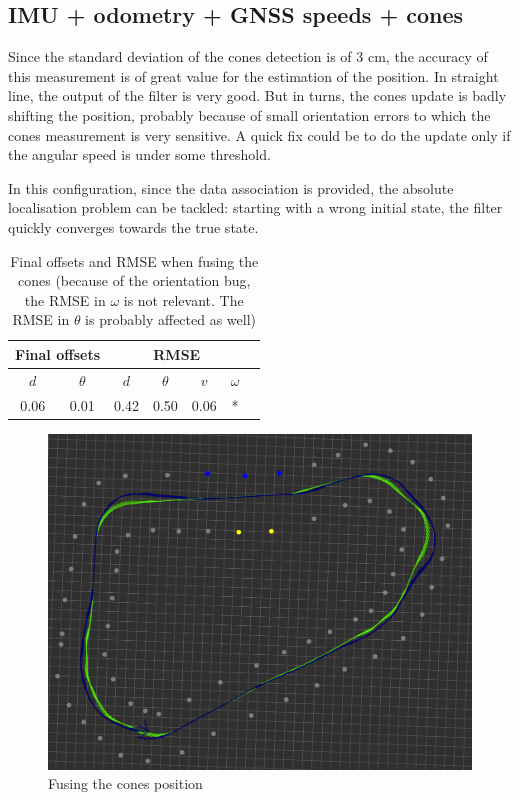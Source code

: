 \documentclass[10pt,a4paper, twocolumn]{article}
\begin{document}
\subsection{IMU + odometry + GNSS speeds + cones}
Since the standard deviation of the cones detection is of 3 cm, the accuracy of this measurement is of great value for the estimation of the position. In straight line, the output of the filter is very good. But in turns, the cones update is badly shifting the position, probably because of small orientation errors to which the cones measurement is very sensitive. A quick fix could be to do the update only if the angular speed is under some threshold.

In this configuration, since the data association is provided, the absolute localisation problem can be tackled: starting with a wrong initial state, the filter quickly converges towards the true state.

\begin{table}[h]
	\begin{center}
		\begin{tabular}{|c|c|c|c|c|c|c|}
			\hline
			\multicolumn{2}{|c|}{\textbf{Final offsets}} &  \multicolumn{4}{c|}{\textbf{RMSE}} \\ \hline
			$d$ & $\theta$ & $d$ & $\theta$ & $v$ & $\omega$ \\ \hline
			0.06 & 0.01 & 0.42 & 0.50 & 0.06 & * \\
			\hline
			
		\end{tabular}
		\caption{Final offsets and RMSE when fusing the cones (because of the orientation bug, the RMSE in $\omega$ is not relevant. The RMSE in $\theta$ is probably affected as well)}
	\end{center}	
\end{table}

\begin{figure}[h]
	\centering
	\includegraphics[width=\columnwidth]{images/cones.png}
	\caption{Fusing the cones position}
	\label{fig:cones}
\end{figure}
\end{document}
